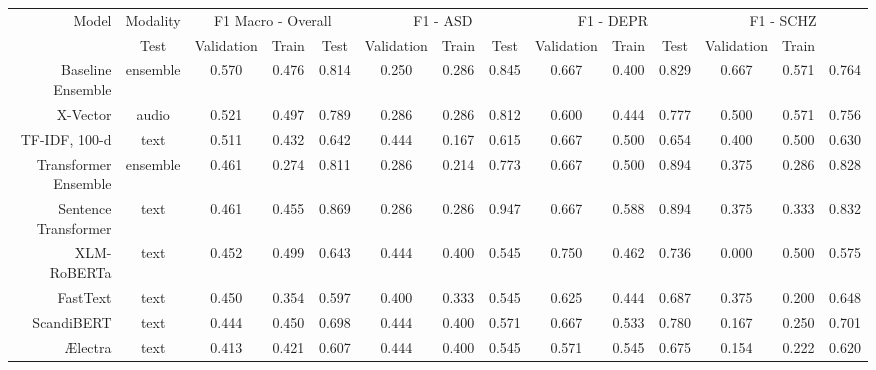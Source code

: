 \begin{tabular}{rc||ccc||ccc||ccc||ccc}
\toprule
                                  Model & Modality & \multicolumn{3}{c}{F1 Macro - Overall} & \multicolumn{3}{c}{F1 - ASD} & \multicolumn{3}{c}{F1 - DEPR} & \multicolumn{3}{c}{F1 - SCHZ} \\
                                        &               Test & Validation & Train &     Test & Validation & Train &      Test & Validation & Train &      Test & Validation & Train \\
\midrule
                      Baseline Ensemble & ensemble &              0.570 &      0.476 & 0.814 &    0.250 &      0.286 & 0.845 &     0.667 &      0.400 & 0.829 &     0.667 &      0.571 & 0.764 \\
                               X-Vector &    audio &              0.521 &      0.497 & 0.789 &    0.286 &      0.286 & 0.812 &     0.600 &      0.444 & 0.777 &     0.500 &      0.571 & 0.756 \\
                          TF-IDF, 100-d &     text &              0.511 &      0.432 & 0.642 &    0.444 &      0.167 & 0.615 &     0.667 &      0.500 & 0.654 &     0.400 &      0.500 & 0.630 \\
                   Transformer Ensemble & ensemble &              0.461 &      0.274 & 0.811 &    0.286 &      0.214 & 0.773 &     0.667 &      0.500 & 0.894 &     0.375 &      0.286 & 0.828 \\
                   Sentence Transformer &     text &              0.461 &      0.455 & 0.869 &    0.286 &      0.286 & 0.947 &     0.667 &      0.588 & 0.894 &     0.375 &      0.333 & 0.832 \\
                            XLM-RoBERTa &     text &              0.452 &      0.499 & 0.643 &    0.444 &      0.400 & 0.545 &     0.750 &      0.462 & 0.736 &     0.000 &      0.500 & 0.575 \\
                               FastText &     text &              0.450 &      0.354 & 0.597 &    0.400 &      0.333 & 0.545 &     0.625 &      0.444 & 0.687 &     0.375 &      0.200 & 0.648 \\
                             ScandiBERT &     text &              0.444 &      0.450 & 0.698 &    0.444 &      0.400 & 0.571 &     0.667 &      0.533 & 0.780 &     0.167 &      0.250 & 0.701 \\
                                Ælectra &     text &              0.413 &      0.421 & 0.607 &    0.444 &      0.400 & 0.545 &     0.571 &      0.545 & 0.675 &     0.154 &      0.222 & 0.620 \\

\end{tabular}
